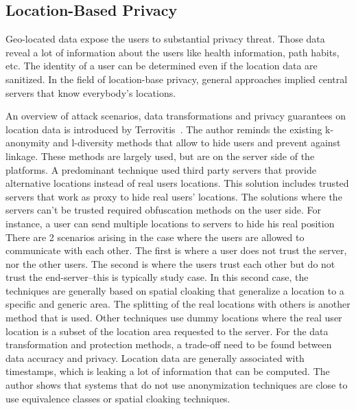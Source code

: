\subsection{Location-Based Privacy}

Geo-located data expose the users to substantial privacy threat.
Those data reveal a lot of information about the users like health information, path habits, etc.
The identity of a user can be determined even if the location data are sanitized.
In the field of location-base privacy, general approaches implied central servers that know everybody's locations.

An overview of attack scenarios, data transformations and privacy guarantees on location data is introduced by Terrovitis~\cite{DBLP:journals/sigkdd/Terrovitis11}.
The author reminds the existing k-anonymity and l-diversity methods that allow to hide users and prevent against linkage.
These methods are largely used, but are on the server side of the platforms.
A predominant technique used third party servers that provide alternative locations instead of real users locations.
This solution includes trusted servers that work as proxy to hide real users' locations.
The solutions where the servers can't be trusted required obfuscation methods on the user side.
For instance, a user can send multiple locations to servers to hide his real position
There are 2 scenarios arising in the case where the users are allowed to communicate with each other.
The first is where a user does not trust the server, nor the other users.
The second is where the users trust each other but do not trust the end-server--this is typically study case.
In this second case, the techniques are generally based on spatial cloaking that generalize a location to a specific and generic area.
The splitting of the real locations with others is another method that is used.
Other techniques use dummy locations where the real user location is a subset of the location area requested to the server.
For the data transformation and protection methods, a trade-off need to be found between data accuracy and privacy.
Location data are generally associated with timestamps, which is leaking a lot of information that can be computed.
The author shows that systems that do not use anonymization techniques are close to use equivalence classes or spatial cloaking techniques.

